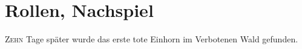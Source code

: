 \chapter{Rollen, Nachspiel}

\lettrine{Z}{ehn} Tage später wurde das erste tote Einhorn im Verbotenen Wald gefunden.
